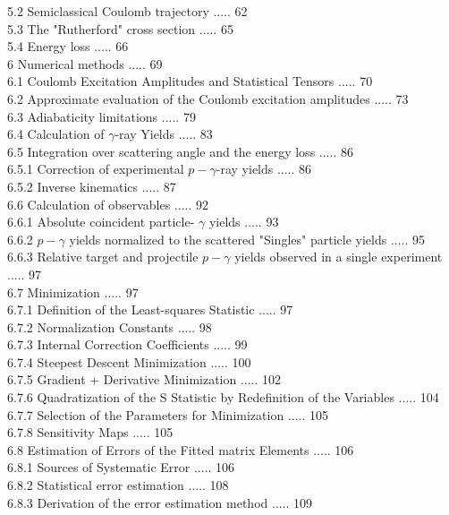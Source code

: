 \documentclass[10pt]{article}
\begin{document}
5.2 Semiclassical Coulomb trajectory ..... 62\\
5.3 The "Rutherford" cross section ..... 65\\
5.4 Energy loss ..... 66\\
6 Numerical methods ..... 69\\
6.1 Coulomb Excitation Amplitudes and Statistical Tensors ..... 70\\
6.2 Approximate evaluation of the Coulomb excitation amplitudes ..... 73\\
6.3 Adiabaticity limitations ..... 79\\
6.4 Calculation of $\gamma$-ray Yields ..... 83\\
6.5 Integration over scattering angle and the energy loss ..... 86\\
6.5.1 Correction of experimental $p-\gamma$-ray yields ..... 86\\
6.5.2 Inverse kinematics ..... 87\\
6.6 Calculation of observables ..... 92\\
6.6.1 Absolute coincident particle- $\gamma$ yields ..... 93\\
6.6.2 $p-\gamma$ yields normalized to the scattered "Singles" particle yields ..... 95\\
6.6.3 Relative target and projectile $p-\gamma$ yields observed in a single experiment ..... 97\\
6.7 Minimization ..... 97\\
6.7.1 Definition of the Least-squares Statistic ..... 97\\
6.7.2 Normalization Constants ..... 98\\
6.7.3 Internal Correction Coefficients ..... 99\\
6.7.4 Steepest Descent Minimization ..... 100\\
6.7.5 Gradient + Derivative Minimization ..... 102\\
6.7.6 Quadratization of the S Statistic by Redefinition of the Variables ..... 104\\
6.7.7 Selection of the Parameters for Minimization ..... 105\\
6.7.8 Sensitivity Maps ..... 105\\
6.8 Estimation of Errors of the Fitted matrix Elements ..... 106\\
6.8.1 Sources of Systematic Error ..... 106\\
6.8.2 Statistical error estimation ..... 108\\
6.8.3 Derivation of the error estimation method ..... 109\\
\end{document}
